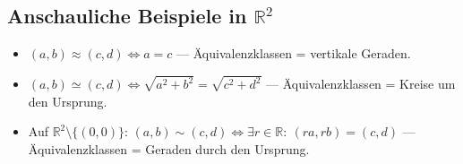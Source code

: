 \subsection{Anschauliche Beispiele in $\mathbb{R}^2$}
\begin{itemize}
  \item $(a,b)\approx(c,d)\iff a=c$ \;— Äquivalenzklassen = vertikale Geraden.
  \item $(a,b)\simeq(c,d)\iff \sqrt{a^2+b^2}=\sqrt{c^2+d^2}$ \;— Äquivalenzklassen = Kreise um den Ursprung.
  \item Auf $\mathbb{R}^2\setminus\{(0,0)\}$: $(a,b)\sim(c,d)\iff \exists r\in\mathbb{R}:\ (ra,rb)=(c,d)$ \;— Äquivalenzklassen = Geraden durch den Ursprung.
\end{itemize}